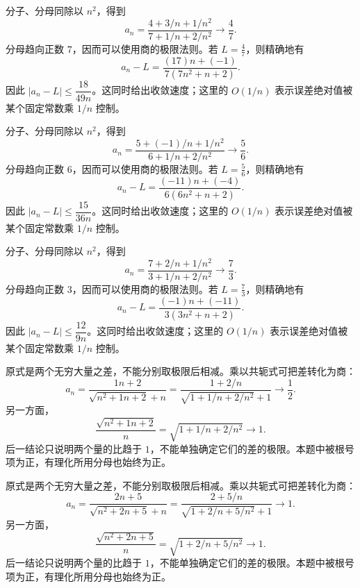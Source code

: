\documentclass[UTF8,12pt,a4paper,fontset=fandol]{ctexart}
\begin{document}
\begin{solve}\label{ans:c1q4}
分子、分母同除以 $n^2$，得到
\[
a_n=\frac{4+3/n+1/n^2}{7+1/n+2/n^2}\longrightarrow \frac{4}{7}.
\]
分母趋向正数 $7$，因而可以使用商的极限法则。若 $L=\frac{4}{7}$，则精确地有
\[
a_n-L=\frac{(17)n+(-1)}{7(7n^2+n+2)}.
\]
因此 $|a_n-L|\le\dfrac{18}{49n}$。这同时给出收敛速度；这里的 $O(1/n)$ 表示误差绝对值被某个固定常数乘 $1/n$ 控制。
\end{solve}

\begin{solve}\label{ans:c1q5}
分子、分母同除以 $n^2$，得到
\[
a_n=\frac{5+(-1)/n+1/n^2}{6+1/n+2/n^2}\longrightarrow \frac{5}{6}.
\]
分母趋向正数 $6$，因而可以使用商的极限法则。若 $L=\frac{5}{6}$，则精确地有
\[
a_n-L=\frac{(-11)n+(-4)}{6(6n^2+n+2)}.
\]
因此 $|a_n-L|\le\dfrac{15}{36n}$。这同时给出收敛速度；这里的 $O(1/n)$ 表示误差绝对值被某个固定常数乘 $1/n$ 控制。
\end{solve}

\begin{solve}\label{ans:c1q6}
分子、分母同除以 $n^2$，得到
\[
a_n=\frac{7+2/n+1/n^2}{3+1/n+2/n^2}\longrightarrow \frac{7}{3}.
\]
分母趋向正数 $3$，因而可以使用商的极限法则。若 $L=\frac{7}{3}$，则精确地有
\[
a_n-L=\frac{(-1)n+(-11)}{3(3n^2+n+2)}.
\]
因此 $|a_n-L|\le\dfrac{12}{9n}$。这同时给出收敛速度；这里的 $O(1/n)$ 表示误差绝对值被某个固定常数乘 $1/n$ 控制。
\end{solve}

\begin{solve}\label{ans:c1q7}
原式是两个无穷大量之差，不能分别取极限后相减。乘以共轭式可把差转化为商：
\[
a_n=\frac{1n+2}{\sqrt{n^2+1n+2}+n}=\frac{1+2/n}{\sqrt{1+1/n+2/n^2}+1}\longrightarrow \frac{1}{2}.
\]
另一方面，
\[
\frac{\sqrt{n^2+1n+2}}n=\sqrt{1+1/n+2/n^2}\longrightarrow1.
\]
后一结论只说明两个量的比趋于 $1$，不能单独确定它们的差的极限。本题中被根号项为正，有理化所用分母也始终为正。
\end{solve}

\begin{solve}\label{ans:c1q8}
原式是两个无穷大量之差，不能分别取极限后相减。乘以共轭式可把差转化为商：
\[
a_n=\frac{2n+5}{\sqrt{n^2+2n+5}+n}=\frac{2+5/n}{\sqrt{1+2/n+5/n^2}+1}\longrightarrow 1.
\]
另一方面，
\[
\frac{\sqrt{n^2+2n+5}}n=\sqrt{1+2/n+5/n^2}\longrightarrow1.
\]
后一结论只说明两个量的比趋于 $1$，不能单独确定它们的差的极限。本题中被根号项为正，有理化所用分母也始终为正。
\end{solve}
\end{document}
